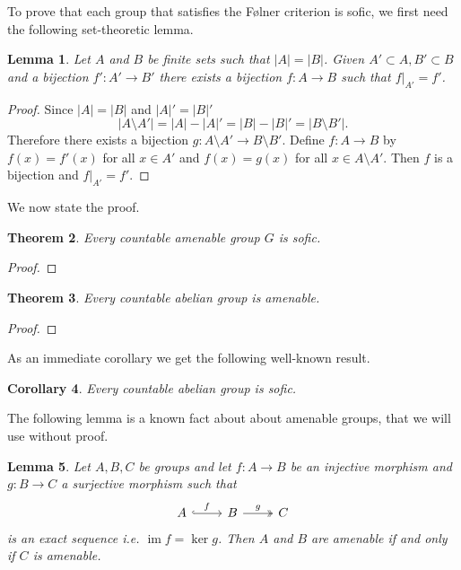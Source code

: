 \documentclass[titlepage, a4paper]{article}
\newcommand{\card}[1]{\left| #1 \right|}
\DeclareMathOperator{\im}{im}
\newtheorem{theorem}{Theorem}[section]
\newtheorem{lemma}[theorem]{Lemma}
\newtheorem{corollary}[theorem]{Corollary}
\theoremstyle{remark}
\begin{document}
To prove that each group that satisfies the Følner criterion is sofic, we first need the following set-theoretic lemma.

\begin{lemma}\label{lem:finite_bijections} 
        Let $A$ and $B$ be finite sets such that $|A| = |B|$. Given $A' \subset A, B' \subset B$ and a bijection $f': A' \to B'$ there exists a bijection $f: A \to B$ such that $f|_{A'} = f'$. 
    \end{lemma}
    \begin{proof}
        Since $\card A = \card B$ and $\card A' = \card B'$
        \[
        \card{A \setminus A'} = \card A - \card A' = \card B - \card B' = \card{B \setminus B'}.
        \]
        Therefore there exists a bijection $g: A \setminus A' \to B \setminus B'$. Define $f: A  \to B$ by $f(x) = f'(x)$ for all $x \in A'$ and $f(x)=g(x)$ for all $x \in A \setminus A'$. Then $f$ is a bijection and $f|_{A'} = f'$.
    \end{proof}

We now state the proof.
 	\begin{theorem}\label{thm:folner_sofic}
        Every countable amenable group $G$ is sofic.
    \end{theorem}
    \begin{proof}
        
 	\end{proof}

    \begin{theorem}\label{thm:countable_abelian_folner}
        Every countable abelian group is amenable. 
    \end{theorem}
    \begin{proof}
        
    \end{proof}
    As an immediate corollary we get the following well-known result.
    \begin{corollary}
    	Every countable abelian group is sofic.	
    \end{corollary}
 
	The following lemma is a known fact about about amenable groups, that we will use without proof.
	\begin{lemma}  %
        \label{lem:amenable_short_exact_sequence}
        Let $A, B, C$ be groups and let $f: A\to B$ be an injective morphism and $g:B\to C$ a surjective morphism such that 
        \[\begin{tikzcd}
            A \arrow[r, "f", hook] & B \arrow[r, "g", two heads] & C
        \end{tikzcd}\]
        is an exact sequence i.e. $\im f = \ker g$. Then $A$ and $B$ are amenable if and only if $C$ is amenable.
    \end{lemma}
\end{document}
